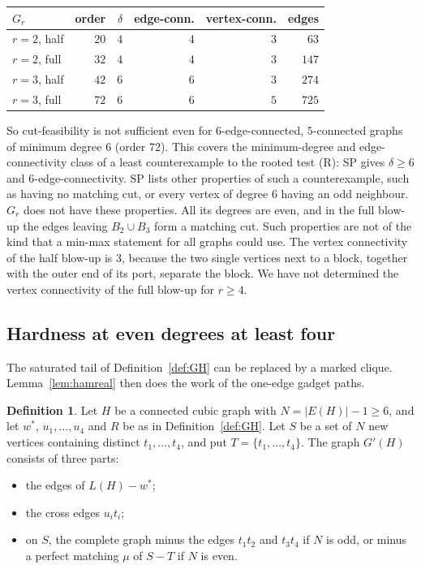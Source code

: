 \documentclass[11pt]{amsart}
\theoremstyle{definition}
\newtheorem{definition}[theorem]{Definition}
\begin{document}
\begin{center}
\begin{tabular}{lrrrrr}
\toprule
$G_r$ & order & $\delta$ & edge-conn. & vertex-conn. & edges\\
\midrule
$r=2$, half & $20$ & $4$ & $4$ & $3$ & $63$\\
$r=2$, full & $32$ & $4$ & $4$ & $3$ & $147$\\
$r=3$, half & $42$ & $6$ & $6$ & $3$ & $274$\\
$r=3$, full & $72$ & $6$ & $6$ & $5$ & $725$\\
\bottomrule
\end{tabular}
\end{center}

So cut-feasibility is not sufficient even for $6$-edge-connected, $5$-connected graphs of minimum degree $6$ (order $72$). This
covers the minimum-degree and edge-connectivity class of a least counterexample to the rooted test
(R): SP gives $\delta\ge6$ and $6$-edge-connectivity. SP lists other properties of such a
counterexample, such as having no matching cut, or every vertex of degree $6$ having an odd
neighbour. $G_r$ does not have these properties. All its degrees are even, and in the full blow-up
the edges leaving $B_2\cup B_3$ form a matching cut. Such properties are not of the kind that a min-max statement for all graphs
could use. The vertex connectivity of the half blow-up is $3$,
because the two single vertices next to a block, together with the outer end of its port, separate
the block. We have not determined the vertex connectivity of the full blow-up for $r\ge4$.

\subsection{Hardness at even degrees at least four}\label{sec:hard4}
The saturated tail of Definition~\ref{def:GH} can be replaced by a marked clique. Lemma~\ref{lem:hamreal}
then does the work of the one-edge gadget paths.

\begin{definition}\label{def:GH4}
Let $H$ be a connected cubic graph with $N=|E(H)|-1\ge6$, and let $w^*$, $u_1,\dots,u_4$ and $R$ be as
in Definition~\ref{def:GH}. Let $S$ be a set of $N$ new vertices containing distinct
$t_1,\dots,t_4$, and put $T=\{t_1,\dots,t_4\}$. The graph $G'(H)$ consists of three parts:
\begin{itemize}
\item the edges of $L(H)-w^*$;
\item the cross edges $u_it_i$;
\item on $S$, the complete graph minus the edges $t_1t_2$ and $t_3t_4$ if $N$ is odd, or minus a
perfect matching $\mu$ of $S-T$ if $N$ is even.
\end{itemize}
\end{definition}
\end{document}
